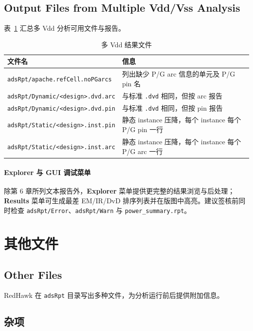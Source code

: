 \subsection*{Output Files from Multiple Vdd/Vss Analysis}

表~\ref{tab:multi-vdd-files} 汇总多 Vdd 分析可用文件与报告。

\begin{table}[htbp]
\centering
\caption{多 Vdd 结果文件}
\label{tab:multi-vdd-files}
\small
\begin{tabular}{@{}p{5.5cm}p{7.5cm}@{}}
\toprule
文件名 & 信息 \\
\midrule
\texttt{adsRpt/apache.refCell.noPGarcs} & 列出缺少 P/G arc 信息的单元及 P/G pin 名 \\
\texttt{adsRpt/Dynamic/<design>.dvd.arc} & 与标准 \texttt{.dvd} 相同，但按 arc 报告 \\
\texttt{adsRpt/Dynamic/<design>.dvd.pin} & 与标准 \texttt{.dvd} 相同，但按 pin 报告 \\
\texttt{adsRpt/Static/<design>.inst.pin} & 静态 instance 压降，每个 instance 每个 P/G pin 一行 \\
\texttt{adsRpt/Static/<design>.inst.arc} & 静态 instance 压降，每个 instance 每个 P/G arc 一行 \\
\bottomrule
\end{tabular}
\end{table}

\paragraph{Explorer 与 GUI 调试菜单}
除第 6 章所列文本报告外，\textbf{Explorer} 菜单提供更完整的结果浏览与后处理；\textbf{Results} 菜单可生成最差 EM/IR/DvD 排序列表并在版图中高亮。建议签核前同时检查 \texttt{adsRpt/Error}、\texttt{adsRpt/Warn} 与 \texttt{power\_summary.rpt}。

\section{其他文件}
\subsection*{Other Files}

RedHawk 在 \texttt{adsRpt} 目录写出多种文件，为分析运行前后提供附加信息。

\subsection{杂项}
